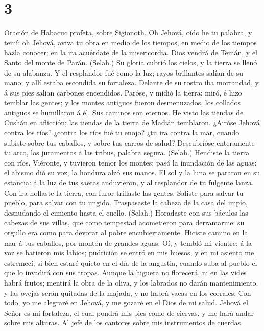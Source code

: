 \hypertarget{section-2}{%
\section{3}\label{section-2}}

 Oración de Habacuc profeta, sobre Sigionoth.
 Oh Jehová, oído he tu palabra, y temí: oh Jehová, aviva
tu obra en medio de los tiempos, en medio de los tiempos hazla conocer;
en la ira acuérdate de la misericordia.  Dios vendrá de
Temán, y el Santo del monte de Parán. (Selah.) Su gloria cubrió los
cielos, y la tierra se llenó de su alabanza.  Y el
resplandor fué como la luz; rayos brillantes salían de su mano; y allí
estaba escondida su fortaleza.  Delante de su rostro iba
mortandad, y á sus pies salían carbones encendidos. 
Paróse, y midió la tierra: miró, é hizo temblar las gentes; y los montes
antiguos fueron desmenuzados, los collados antiguos se humillaron á él.
Sus caminos son eternos.  He visto las tiendas de Cushán
en aflicción; las tiendas de la tierra de Madián temblaron.
 ¿Airóse Jehová contra los ríos? ¿contra los ríos fué tu
enojo? ¿tu ira contra la mar, cuando subiste sobre tus caballos, y sobre
tus carros de salud?  Descubrióse enteramente tu arco, los
juramentos á las tribus, palabra segura. (Selah.) Hendiste la tierra con
ríos.  Viéronte, y tuvieron temor los montes: pasó la
inundación de las aguas: el abismo dió su voz, la hondura alzó sus
manos.  El sol y la luna se pararon en su estancia: á la
luz de tus saetas anduvieron, y al resplandor de tu fulgente lanza.
 Con ira hollaste la tierra, con furor trillaste las
gentes.  Saliste para salvar tu pueblo, para salvar con
tu ungido. Traspasaste la cabeza de la casa del impío, desnudando el
cimiento hasta el cuello. (Selah.)  Horadaste con sus
báculos las cabezas de sus villas, que como tempestad acometieron para
derramarme: su orgullo era como para devorar al pobre encubiertamente.
 Hiciste camino en la mar á tus caballos, por montón de
grandes aguas.  Oí, y tembló mi vientre; á la voz se
batieron mis labios; pudrición se entró en mis huesos, y en mi asiento
me estremecí; si bien estaré quieto en el día de la angustia, cuando
suba al pueblo el que lo invadirá con sus tropas.  Aunque
la higuera no florecerá, ni en las vides habrá frutos; mentirá la obra
de la oliva, y los labrados no darán mantenimiento, y las ovejas serán
quitadas de la majada, y no habrá vacas en los corrales; 
Con todo, yo me alegraré en Jehová, y me gozaré en el Dios de mi salud.
 Jehová el Señor es mi fortaleza, el cual pondrá mis pies
como de ciervas, y me hará andar sobre mis alturas. Al jefe de los
cantores sobre mis instrumentos de cuerdas.
